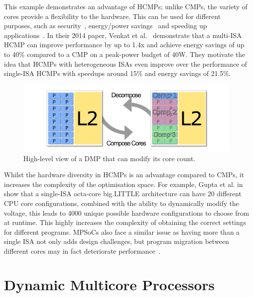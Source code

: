 This example demonstrates an advantage of HCMPs; unlike CMPs, the variety of cores provide a flexibility to the hardware.
This can be used for different purposes, such as security~\cite{venkatHipstr2016}, energy/power savings~\cite{venkat2014harnessingisa} and speeding up applications~\cite{venkat2014harnessingisa}.
In their 2014 paper, Venkat et al.~\cite{venkat2014harnessingisa} demonstrate that a multi-ISA HCMP can improve performance by up to 1.4x and achieve energy savings of up to 40\% compared to a CMP on a peak-power budget of 40W.
They motivate the idea that HCMPs with heterogeneous ISAs even improve over the performance of single-ISA HCMPs with speedups around 15\% and energy savings of 21.5\%.

\begin{figure}[t]
    \centering
    \includegraphics[width=1\textwidth]{background/graphics/cmp_new.pdf}
	\vspace{-3em}
    \caption{High-level view of a DMP that can modify its core count.}
    \label{fig:dynmulticore}
	\vspace{-0.5em}
\end{figure}
Whilst the hardware diversity in HCMPs is an advantage compared to CMPs, it increases the complexity of the optimisation space.
For example, Gupta et al. in ~\cite{Gupta2017Dypo} show that a single-ISA octa-core big.LITTLE architecture can have 20 different CPU core configurations, combined with the ability to dynamically modify the voltage, this leads to 4000 unique possible hardware configurations to choose from at runtime.
This highly increases the complexity of obtaining the correct settings for different programs.
MPSoCs also face a similar issue as having more than a single ISA not only adds design challenges, but program migration between different cores may in fact deteriorate performance~\cite{DeVuystMigration2012}.
\vspace{-1em}
\section{Dynamic Multicore Processors}~\label{sec:dmp}
\vspace{-1em}


